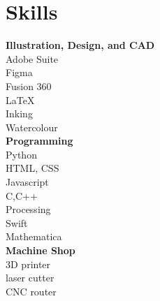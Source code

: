 \documentclass[10pt]{article} %
\begin{document}
\hspace{0.5cm}
\begin{minipage}[t]{0.2\textwidth}
  \section*{Skills}
  \textbf{Illustration, Design, and CAD}\\
  Adobe Suite\\
  Figma\\
  Fusion 360\\
  LaTeX\\
  Inking\\
  Watercolour\\

  \textbf{Programming}\\
  Python\\
  HTML, CSS\\
  Javascript\\
  C,C++\\
  Processing\\ Swift \\
  Mathematica\\
  

  \textbf{Machine Shop}\\
  3D printer\\ laser cutter\\ CNC router\\
\end{minipage}
\end{document}
